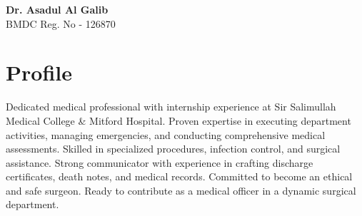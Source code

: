 \documentclass[a4paper,12pt]{article}
\begin{document}
\begin{minipage}[t][2.5cm]{\textwidth}
    \raggedright
  \begin{minipage}[h][2cm][h]{\textwidth}
    {\huge\bfseries\color{black}Dr. Asadul Al Galib}\\
    \large{BMDC Reg. No - 126870}
  \end{minipage}
\end{minipage} 
\begin{minipage}[t][6.6cm]{\textwidth}
  \section*{Profile}
	Dedicated medical professional with internship experience at Sir Salimullah Medical College \& Mitford Hospital. 
	Proven expertise in executing department activities, managing emergencies, and conducting comprehensive medical assessments. 
	Skilled in specialized procedures, infection control, and surgical assistance. 
	Strong communicator with experience in crafting discharge certificates, death notes, and medical records.  
	Committed to become an ethical and safe surgeon.  
	Ready to contribute as a medical officer in a dynamic surgical department.
\end{minipage}
\end{document}
